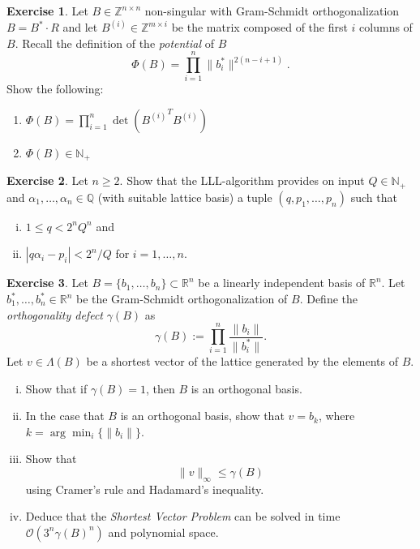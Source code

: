\documentclass[12pt,a4paper]{article}
\theoremstyle{plain}
\newtheorem*{Sol*}{Solution}
\theoremstyle{definition}
\newtheorem{Ex}{Exercise}
\def \R {\mathbb R}
\newif\ifsolutions
\newcommand{\exercise}[2]{
			\begin{Ex} #1 \end{Ex}
			\ifsolutions  \begin{Sol*} #2 \end{Sol*} \bigskip \else \bigskip  \fi
		}
\begin{document}
  \exercise{
    Let $B ∈ℤ^{n×n}$ non-singular with Gram-Schmidt orthogonalization $B = B^*⋅ R$ and let $B^{(i)} ∈ℤ^{m ×i}$ be the matrix composed of the first $i$ columns of $B$.  Recall the definition of the \emph{potential} of $B$
    \begin{displaymath}
      Φ(B) = ∏_{i=1}^n \|b_i^*\|^{2(n-i+1)}.
    \end{displaymath}
    Show the following:
    \begin{enumerate}
    \item $ Φ(B) = ∏_{i=1}^n \det\left({B^{(i)}}^T B^{(i)}\right)$
    \item $ Φ(B) ∈ ℕ_+$  
    \end{enumerate}
  }{}


  \exercise{Let $n≥2$. 
    Show that the LLL-algorithm provides on input $Q ∈ℕ_+$ and $α_1,\dots,α_n ∈ℚ$ (with suitable lattice basis)  a tuple $(q,p_1,\dots,p_n)$ such that
      \begin{enumerate}[i)] 
      \item $1 ≤ q < 2^n Q^n$ and
      \item $| q α_i - p_i | < 2^n/Q$ for $i=1,\dots,n$. 
      \end{enumerate}

    }{}
  
\exercise{
	Let $B = \{b_1,\dots,b_n\} \subset \R^n$ be a linearly independent basis of $\R^n$. 
	Let $b_1^*,\dots,b_n^* ∈ ℝ^n$ be the Gram-Schmidt orthogonalization of $B$.
	Define the \emph{orthogonality defect} $\gamma(B)$ as
		\[ \gamma(B) := \prod_{i=1}^n \frac{\| b_i \|}{\| b_i^* \|}. \]
	Let $v \in \Lambda(B)$ be a shortest vector of the lattice generated by the elements of $B$.
	\begin{enumerate}[i)]
		\item Show that if $\gamma(B)=1$, then $B$ is an orthogonal basis.
		\item In the case that  $B$ is an orthogonal basis, show that $v = b_k$, where $k = \arg\min_i \{ \| b_i \| \}$.
		\item Show that
			\[ \| v \|_\infty \leq \gamma(B) \]
		using Cramer's rule and Hadamard's inequality.
		\item Deduce that the \emph{Shortest Vector Problem} can be solved in time $\mathcal{O}\left(3^n\gamma(B)^n\right)$ and polynomial space.
		
	\end{enumerate}
}
{}
\end{document}
